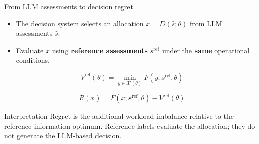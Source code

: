 \documentclass[aspectratio=169,11pt]{beamer}
\newcommand{\key}[1]{\textcolor{deepblue}{\textbf{#1}}}
\begin{document}
\begin{frame}{From LLM assessments to decision regret}

\begin{itemize}
\setlength{\itemsep}{8pt}

\item The decision system selects an allocation $x=D(\hat s;\theta)$ from LLM assessments $\hat s$.

\item Evaluate $x$ using \key{reference assessments} $s^{\mathrm{ref}}$ under the \key{same} operational conditions.

\end{itemize}

\[
V^{\mathrm{ref}}(\theta)
=
\min_{y\in\mathcal X(\theta)}
F(y;s^{\mathrm{ref}},\theta)
\]

\[
\boxed{
R(x)=F(x;s^{\mathrm{ref}},\theta)-V^{\mathrm{ref}}(\theta)
}
\]

\begin{block}{Interpretation}
Regret is the additional workload imbalance relative to the reference-information optimum. Reference labels evaluate the allocation; they do not generate the LLM-based decision.
\end{block}

\end{frame}
\end{document}
